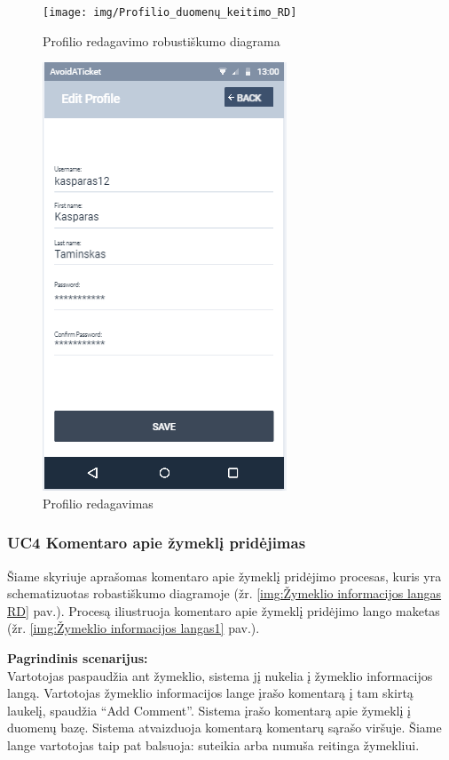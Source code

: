 \documentclass{VUMIFPSkursinis}
\begin{document}
		\begin{figure}[H]
				\centering
				\texttt{[image: img/Profilio\_duomenų\_keitimo\_RD]}
				\caption{Profilio redagavimo robustiškumo diagrama}
				\label{img:profilio redagavimas RD}
			\end{figure}
	\begin{figure}[H]
				\centering
				\includegraphics[scale=0.55]{img/mockup_profileedit}
				\caption{Profilio redagavimas}
				\label{img:profilio redagavimas}
			\end{figure}

\subsubsection{UC4 Komentaro apie žymeklį pridėjimas}
	Šiame skyriuje aprašomas komentaro apie žymeklį pridėjimo procesas, kuris yra schematizuotas robastiškumo diagramoje (žr. \ref{img:Žymeklio informacijos langas RD} pav.). 
	Procesą iliustruoja komentaro apie žymeklį pridėjimo lango maketas (žr. \ref{img:Žymeklio informacijos langas1} pav.).

	\textbf{Pagrindinis scenarijus:}\\
    Vartotojas paspaudžia ant žymeklio, sistema jį nukelia į žymeklio informacijos langą. Vartotojas žymeklio informacijos lange įrašo komentarą į tam skirtą laukelį, spaudžia “Add Comment”. Sistema įrašo komentarą apie žymeklį į duomenų bazę. Sistema atvaizduoja komentarą komentarų sąrašo viršuje. Šiame lange vartotojas taip pat balsuoja: suteikia arba numuša reitinga žymekliui.
\end{document}
